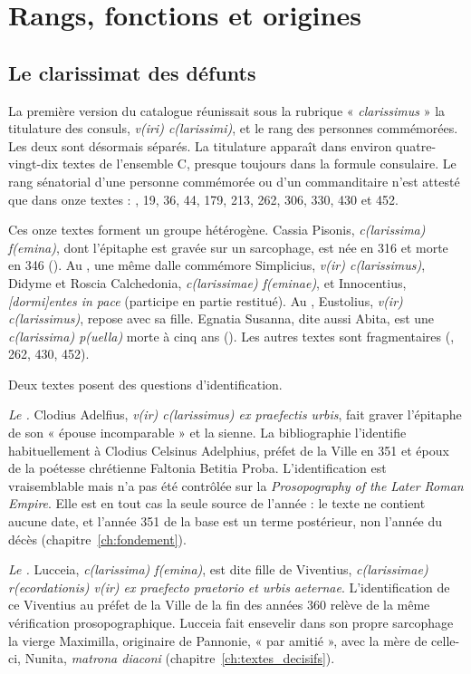 \chapter{Rangs, fonctions et origines}\label{ch:rangs}

\section{Le clarissimat des défunts}

La première version du catalogue réunissait sous la rubrique « \emph{clarissimus} » la titulature des consuls, \emph{v(iri) c(larissimi)}, et le rang des personnes commémorées. Les deux sont désormais séparés. La titulature apparaît dans environ quatre-vingt-dix textes de l’ensemble C, presque toujours dans la formule consulaire. Le rang sénatorial d’une personne commémorée ou d’un commanditaire n’est attesté que dans onze textes : , 19, 36, 44, 179, 213, 262, 306, 330, 430 et 452.

Ces onze textes forment un groupe hétérogène. Cassia Pisonis, \emph{c(larissima) f(emina)}, dont l’épitaphe est gravée sur un sarcophage, est née en 316 et morte en 346 (). Au , une même dalle commémore Simplicius, \emph{v(ir) c(larissimus)}, Didyme et Roscia Calchedonia, \emph{c(larissimae) f(eminae)}, et Innocentius, \emph{[dormi]entes in pace} (participe en partie restitué). Au , Eustolius, \emph{v(ir) c(larissimus)}, repose avec sa fille. Egnatia Susanna, dite aussi Abita, est une \emph{c(larissima) p(uella)} morte à cinq ans (). Les autres textes sont fragmentaires (, 262, 430, 452).

Deux textes posent des questions d’identification.

\emph{Le .} Clodius Adelfius, \emph{v(ir) c(larissimus) ex praefectis urbis}, fait graver l’épitaphe de son « épouse incomparable » et la sienne. La bibliographie l’identifie habituellement à Clodius Celsinus Adelphius, préfet de la Ville en 351 et époux de la poétesse chrétienne Faltonia Betitia Proba. L’identification est vraisemblable mais n’a pas été contrôlée sur la \emph{Prosopography of the Later Roman Empire}. Elle est en tout cas la seule source de l’année : le texte ne contient aucune date, et l’année 351 de la base est un terme postérieur, non l’année du décès (chapitre~\ref{ch:fondement}).

\emph{Le .} Lucceia, \emph{c(larissima) f(emina)}, est dite fille de Viventius, \emph{c(larissimae) r(ecordationis) v(ir) ex praefecto praetorio et urbis aeternae}. L’identification de ce Viventius au préfet de la Ville de la fin des années 360 relève de la même vérification prosopographique. Lucceia fait ensevelir dans son propre sarcophage la vierge Maximilla, originaire de Pannonie, « par amitié », avec la mère de celle-ci, Nunita, \emph{matrona diaconi} (chapitre~\ref{ch:textes_decisifs}).

